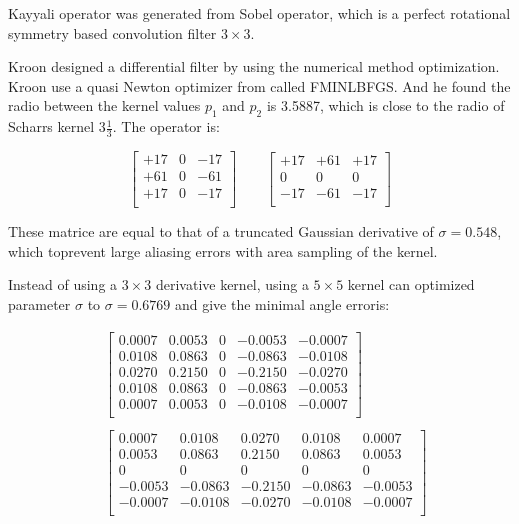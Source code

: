 \documentclass[10pt,twocolumn,letterpaper]{article}
\begin{document}
Kayyali operator was generated from Sobel operator, which is a perfect rotational 
symmetry based convolution filter $3 \times 3$.\cite{ref8} 

Kroon designed a differential filter by using the numerical method optimization.\cite{ref9} 
Kroon use a quasi Newton optimizer from called FMINLBFGS. And he found the radio 
between the kernel values $p_1$ and $p_2$ is 3.5887, which is close to the radio 
of Scharrs kernel $3 \frac{1}{3}$. The operator is: 

$$
\begin{bmatrix}
		+17 & 0 & -17 \\
		+61 & 0 & -61 \\
		+17 & 0 & -17\\
\end{bmatrix}
\qquad
\begin{bmatrix}
	+17 & +61 & +17 \\
	0 & 0 & 0 \\
	-17 & -61 & -17\\
\end{bmatrix}
$$

These matrice are equal to that of a truncated Gaussian derivative of $\sigma = 0.548$, 
which toprevent large aliasing errors with area sampling of the kernel. 

Instead of using a $3 \times 3$ derivative kernel, using a $5 \times 5$ kernel can 
optimized parameter $\sigma$ to $\sigma = 0.6769$ and give the minimal angle erroris:

$$
\begin{aligned}
& \begin{bmatrix}
	0.0007 & 0.0053 & 0 & -0.0053 & -0.0007 \\
	0.0108 & 0.0863 & 0 & -0.0863 & -0.0108 \\
	0.0270 & 0.2150 & 0 & -0.2150 & -0.0270 \\
	0.0108 & 0.0863 & 0 & -0.0863 & -0.0053 \\
	0.0007 & 0.0053 & 0 & -0.0108 & -0.0007 \\
\end{bmatrix} \\ \\
& \begin{bmatrix}
	0.0007 & 0.0108 & 0.0270 & 0.0108 & 0.0007 \\
	0.0053 & 0.0863 & 0.2150 & 0.0863 & 0.0053 \\
	0 & 0 & 0 & 0 & 0 \\
	-0.0053 & -0.0863 & -0.2150 & -0.0863 & -0.0053 \\
	-0.0007 & -0.0108 & -0.0270 & -0.0108 & -0.0007 \\
\end{bmatrix} \\
\end{aligned}
$$
\end{document}

